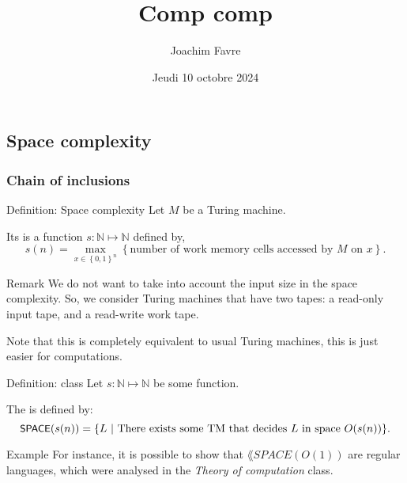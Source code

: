 \documentclass[a4paper]{article}
\title{Comp comp}
\author{Joachim Favre}
\date{Jeudi 10 octobre 2024}
\begin{document}
\maketitle


\subsection{Space complexity}

\subsubsection{Chain of inclusions}

\begin{parag}{Definition: Space complexity}
    Let $M$ be a Turing machine.

    Its  is a function $s: \mathbb{N} \mapsto \mathbb{N}$ defined by, 
    \[s\left(n\right) = \max_{x \in \left\{0, 1\right\}^n} \left\{\text{number of work memory cells accessed by $M$ on $x$}\right\}.\]

    \begin{subparag}{Remark}
        We do not want to take into account the input size in the space complexity. So, we consider Turing machines that have two tapes: a read-only input tape, and a read-write work tape.

        Note that this is completely equivalent to usual Turing machines, this is just easier for computations.
    \end{subparag}
\end{parag}

\begin{parag}{Definition:  class}
    Let $s: \mathbb{N} \mapsto \mathbb{N}$ be some function.

    The  is defined by:
    \[\lang{SPACE}\left(s\left(n\right)\right) = \left\{L \suchthat \text{There exists some TM that decides $L$ in space $O\left(s\left(n\right)\right)$}\right\}.\]

    \begin{subparag}{Example}
        For instance, it is possible to show that $\lang{SPACE}\left(O\left(1\right)\right)$ are regular languages, which were analysed in the \textit{Theory of computation} class.
    \end{subparag}
\end{parag}
\end{document}

